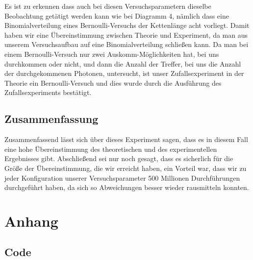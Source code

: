 Es ist zu erkennen dass auch bei diesen Versuchsparametern dieselbe Beobachtung getätigt werden kann wie bei Diagramm 4, nämlich dass eine Binomialverteilung eines Bernoulli-Versuchs der Kettenlänge acht vorliegt.
Damit haben wir eine Übereinstimmung zwischen Theorie und Experiment, da man aus unserem Versuchsaufbau auf eine Binomialverteilung schließen kann. Da man bei einem Bernoulli-Versuch nur zwei Auskomm-Möglichkeiten hat, bei uns durchkommen oder nicht, und dann die Anzahl der Treffer, bei uns die Anzahl der durchgekommenen Photonen, untersucht, ist unser Zufallsexperiment in der Theorie ein Bernoulli-Versuch und dies wurde durch die Ausführung des Zufallsexperiments bestätigt.


\subsection{Zusammenfassung}
Zusammenfassend lässt sich über dieses Experiment sagen, dass es in diesem Fall eine hohe Übereinstimmung des theoretischen und des experimentellen Ergebnisses gibt. Abschließend  sei nur noch gesagt, dass es sicherlich für die Größe der Übereinstimmung, die wir erreicht haben, ein Vorteil war, dass wir zu jeder Konfiguration unserer Versuchsparameter 500 Millionen Durchführungen durchgeführt haben, da sich so Abweichungen besser wieder rausmitteln konnten.

\clearpage
\section{Anhang}
\subsection{Code}
